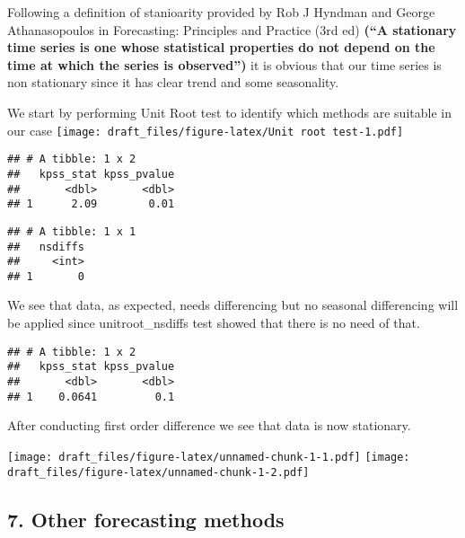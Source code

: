 \documentclass[
]{article}
\begin{document}
Following a definition of stanioarity provided by Rob J Hyndman and
George Athanasopoulos in Forecasting: Principles and Practice (3rd ed)
\textbf{(``A stationary time series is one whose statistical properties
do not depend on the time at which the series is observed'')} it is
obvious that our time series is non stationary since it has clear trend
and some seasonality.

We start by performing Unit Root test to identify which methods are
suitable in our case
\texttt{[image: draft\_files/figure-latex/Unit root test-1.pdf]}

\begin{verbatim}
## # A tibble: 1 x 2
##   kpss_stat kpss_pvalue
##       <dbl>       <dbl>
## 1      2.09        0.01
\end{verbatim}

\begin{verbatim}
## # A tibble: 1 x 1
##   nsdiffs
##     <int>
## 1       0
\end{verbatim}

We see that data, as expected, needs differencing but no seasonal
differencing will be applied since unitroot\_nsdiffs test showed that
there is no need of that.

\begin{verbatim}
## # A tibble: 1 x 2
##   kpss_stat kpss_pvalue
##       <dbl>       <dbl>
## 1    0.0641         0.1
\end{verbatim}

After conducting first order difference we see that data is now
stationary.

\texttt{[image: draft\_files/figure-latex/unnamed-chunk-1-1.pdf]}
\texttt{[image: draft\_files/figure-latex/unnamed-chunk-1-2.pdf]}

\hypertarget{other-forecasting-methods}{%
\subsection{7. Other forecasting
methods}\label{other-forecasting-methods}}
\end{document}

